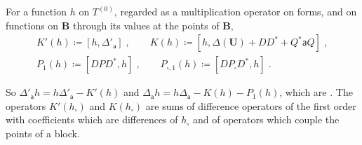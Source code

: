 \documentclass[11pt]{preprint}
\numberwithin{equation}{section}
\begin{document}
\begin{definition}\label{def:commutators}
For a function $h$ on $T^{(0)}$, regarded as a multiplication operator on forms, and on functions on $\mathbf B$ through its values at the points of $\mathbf B$,
\begin{gather*}
    K'(h) \coloneqq [h, \Delta'_{\mathsf a}]\;,
    \qquad
    K(h) \coloneqq [h, \Delta(\mathbf U) + DD^* + Q^*\mathsf aQ]\;,\\
    P_1(h) \coloneqq [DPD^*, h]\;,
    \qquad
    P_{\square,1}(h) \coloneqq [DP_\square D^*, h]\;.
\end{gather*}
\end{definition}

So $\Delta'_{\mathsf a}h = h\Delta'_{\mathsf a} - K'(h)$ and $\Delta_{\mathsf a}h = h\Delta_{\mathsf a} - K(h) - P_1(h)$, which are \cite[(3.88), (3.104)]{BalabanPBG}. The operators $K'(h_\square)$ and $K(h_\square)$ are sums of difference operators of the first order with coefficients which are differences of $h_\square$ and of operators which couple the points of a block.
\end{document}
